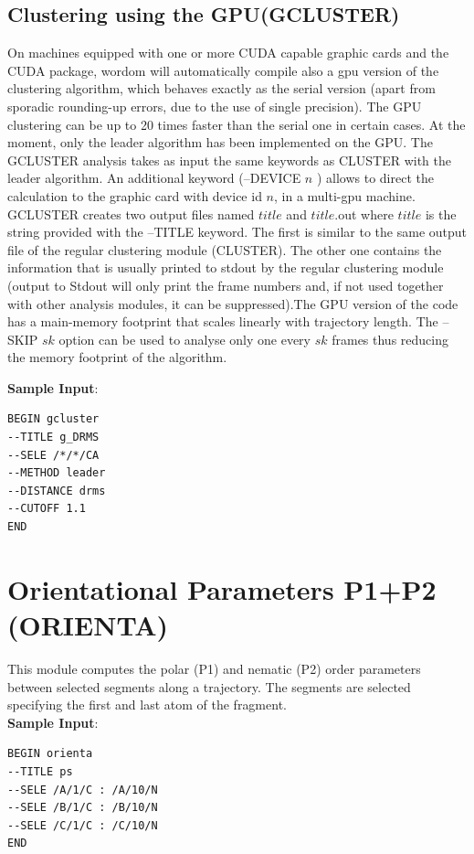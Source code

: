 \documentclass[11pt,twoside,onecolumn,a4paper,openright,notitlepage]{book}[2001/04/21]
\begin{document}
\subsection{Clustering using the GPU(GCLUSTER)}
On machines equipped with one or more CUDA capable graphic cards and the CUDA package, wordom will automatically compile also a gpu version of the clustering algorithm, which behaves exactly as the serial version (apart from sporadic rounding-up errors, due to the use of single precision). The GPU clustering can be up to 20 times faster than the serial one in certain cases. At the moment, only the leader algorithm has been implemented on the GPU. The GCLUSTER analysis takes as input the same keywords as CLUSTER with the leader algorithm. An additional keyword (--DEVICE $n$ ) allows to direct the calculation to the graphic card with device id $n$, in a multi-gpu machine. GCLUSTER creates two output files named $title$ and $title$.out where $title$ is the string provided with the --TITLE keyword. The first is similar to the same output file of the regular clustering module (CLUSTER). The other one contains the information that is usually printed to stdout by the regular clustering module (output to Stdout will only print the frame numbers and, if not used together with other analysis modules, it can be suppressed).The GPU version of the code has a main-memory footprint that scales linearly with trajectory length. The --SKIP $sk$ option can be used to analyse only one every $sk$ frames thus reducing the memory footprint of the algorithm.

\textbf{\large Sample Input}:
\begin{verbatim}
BEGIN gcluster
--TITLE g_DRMS
--SELE /*/*/CA
--METHOD leader
--DISTANCE drms
--CUTOFF 1.1
END
\end{verbatim}


\clearpage

\section{Orientational Parameters P1+P2 (ORIENTA)}
This module computes the polar (P1) and nematic (P2) order parameters\cite{cecchini:amyloid} between selected segments along a trajectory. The segments are selected specifying the first and last atom of the fragment.\\

\textbf{\large Sample Input}:
\begin{verbatim}
BEGIN orienta
--TITLE ps
--SELE /A/1/C : /A/10/N
--SELE /B/1/C : /B/10/N
--SELE /C/1/C : /C/10/N
END
\end{verbatim}
\end{document}
